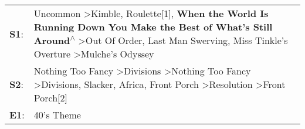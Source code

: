 \begin{supertabular}{p{0.03\textwidth}p{0.92\textwidth}}
 \textbf{S1}:  &  Uncommon\textsuperscript{} \textgreater \enspace Kimble\textsuperscript{}, \enspace Roulette[1]\textsuperscript{}, \enspace \textbf{When the World Is Running Down You Make the Best of What's Still Around\textsuperscript{$\wedge$}} \textgreater \enspace Out Of Order\textsuperscript{}, \enspace Last Man Swerving\textsuperscript{}, \enspace Miss Tinkle's Overture\textsuperscript{} \textgreater \enspace Mulche's Odyssey\textsuperscript{}  \enspace  \\
 \textbf{S2}:  &                             Nothing Too Fancy\textsuperscript{} \textgreater \enspace Divisions\textsuperscript{} \textgreater \enspace Nothing Too Fancy\textsuperscript{} \textgreater \enspace Divisions\textsuperscript{}, \enspace Slacker\textsuperscript{}, \enspace Africa\textsuperscript{}, \enspace Front Porch\textsuperscript{} \textgreater \enspace Resolution\textsuperscript{} \textgreater \enspace Front Porch[2]\textsuperscript{}  \enspace  \\
 \textbf{E1}:  &                                                                                                                                                                                                                                                                                                                                                                                                                           40's Theme\textsuperscript{}  \enspace  \\
\end{supertabular}

